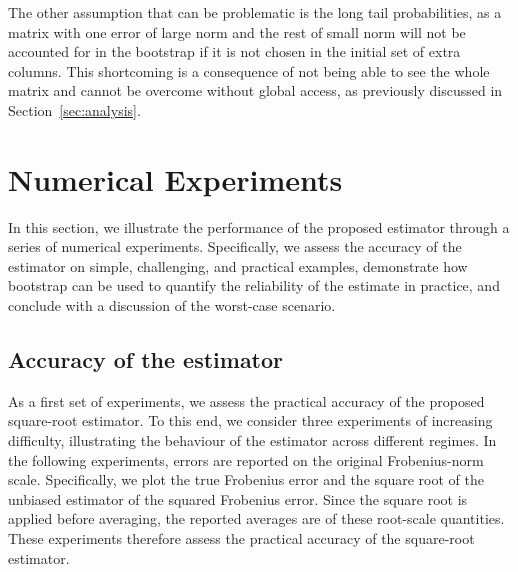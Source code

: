 \documentclass[11pt]{article}
\begin{document}
The other assumption that can be problematic is the long tail probabilities, as a matrix with one error of large norm and the rest of small norm will not be accounted for in the bootstrap if it is not chosen in the initial set of extra columns.
This shortcoming is a consequence of not being able to see the whole matrix and cannot be overcome without global access, as previously discussed in Section~\ref{sec:analysis}.



\section{Numerical Experiments}
\label{sec:experiments}
In this section, we illustrate the performance of the proposed estimator through a series of numerical experiments.
Specifically, we assess the accuracy of the estimator on simple, challenging, and practical examples,
demonstrate how bootstrap can be used to quantify the reliability of the estimate in practice,
and conclude with a discussion of the worst-case scenario.

\subsection{Accuracy of the estimator}

As a first set of experiments, we assess the practical accuracy of the proposed square-root estimator.
To this end, we consider three experiments of increasing difficulty, illustrating the behaviour of the estimator across different regimes.
In the following experiments, errors are reported on the original Frobenius-norm scale. Specifically, we plot the true Frobenius error and the square root of the unbiased estimator of the squared Frobenius error. Since the square root is applied before averaging, the reported averages are of these root-scale quantities. These experiments therefore assess the practical accuracy of the square-root estimator.
\end{document}
